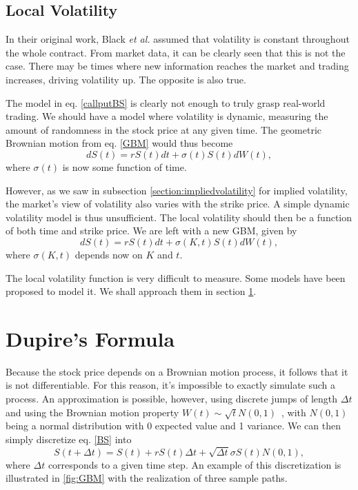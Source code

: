 \subsection{Local Volatility}
\label{subsection:localvolatility}
In their original work, Black \textit{et al.} assumed that volatility is constant throughout the whole contract. From market data, it can be clearly seen that this is not the case. There may be times where new information reaches the market and trading increases, driving volatility up. The opposite is also true.

The model in eq. \eqref{callputBS} is clearly not enough to truly grasp real-world trading. We should have a model where volatility is dynamic, measuring the amount of randomness in the stock price at any given time.
The geometric Brownian motion from eq. \ref{GBM} would thus become
\begin{equation*}
dS(t)=rS(t)dt+\sigma(t) S(t)dW(t),
\end{equation*}
\noindent where $\sigma(t)$ is now some function of time.


However, as we saw in subsection \ref{section:impliedvolatility} for implied volatility, the market's view of volatility also varies with the strike price. A simple dynamic volatility model is thus unsufficient. The local volatility should then be a function of both time and strike price. We are left with a new GBM, given by
\begin{equation}\label{GBM2}
dS(t)=rS(t)dt+\sigma(K,t) S(t)dW(t),
\end{equation}
\noindent where $\sigma(K,t)$ depends now on $K$ and $t$.

The local volatility function is very difficult to measure. Some models have been proposed to model it. We shall approach them in section \ref{section:Dupire}.


\section{Dupire's Formula}
\label{section:Dupire}

\iffalse
Because the stock price depends on a Brownian motion process, it follows that it is not differentiable. For this reason, it's impossible to exactly simulate such a process. An approximation is possible, however, using discrete jumps of length $\Delta t$ and using the Brownian motion property $W(t)\sim \sqrt{t}N(0,1)$~\cite{Mikosch}, with $N(0,1)$ being a normal distribution with 0 expected value and 1 variance.
We can then simply discretize eq. \eqref{BS} into
\begin{equation}
S(t+\Delta t)=S(t)+rS(t)\Delta t+\sqrt{\Delta t}\sigma S(t)N(0,1),
\end{equation}
\noindent where $\Delta t$ corresponds to a given time step. An example of this discretization is illustrated in \autoref{fig:GBM} with the realization of three sample paths.

